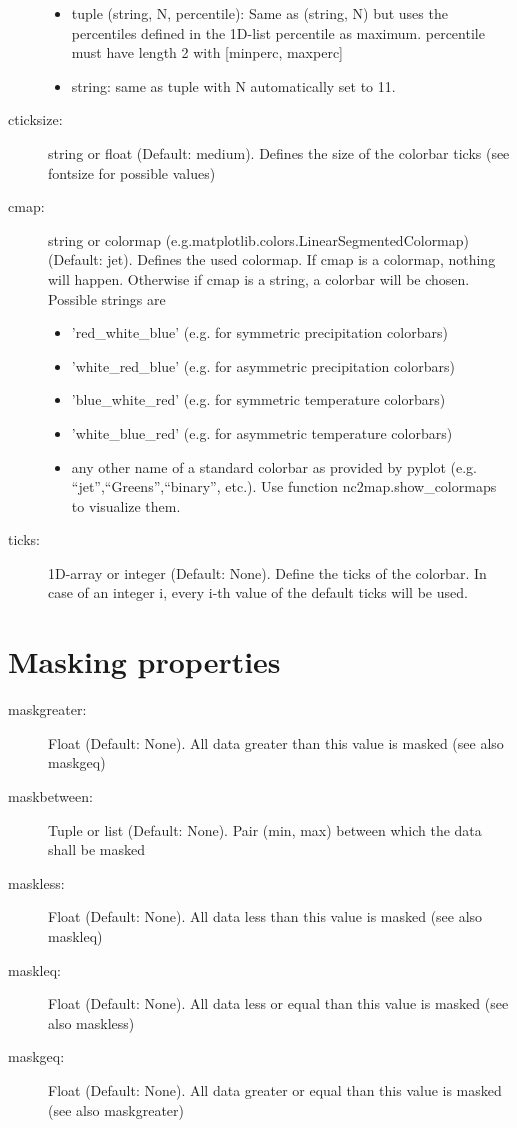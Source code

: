 \begin{description}
\begin{itemize}
    \item tuple (string, N, percentile): Same as (string, N) but uses the percentiles defined in the 1D-list percentile as maximum. percentile must have length 2 with [minperc, maxperc]
    \item string: same as tuple with N automatically set to 11.
\end{itemize}

    \item[\gls*{cticksize}:] \label{item:cticksize}  string or float (Default: medium). Defines the size of the colorbar ticks (see fontsize for possible values)
    \item[\gls*{cmap}:] \label{item:cmap}  string or colormap (e.g.matplotlib.colors.LinearSegmentedColormap) (Default: jet). Defines the used colormap. If cmap is a colormap, nothing will happen. Otherwise if cmap is a string, a colorbar will be chosen. Possible strings are
\begin{itemize}
    \item 'red\_white\_blue' (e.g. for symmetric precipitation colorbars)
    \item 'white\_red\_blue' (e.g. for asymmetric precipitation colorbars)
    \item 'blue\_white\_red' (e.g. for symmetric temperature colorbars)
    \item 'white\_blue\_red' (e.g. for asymmetric temperature colorbars)
    \item any other name of a standard colorbar as provided by pyplot (e.g. \enquote{jet},\enquote{Greens},\enquote{binary}, etc.). Use function nc2map.show\_colormaps to visualize them.
\end{itemize}

    \item[\gls*{ticks}:] \label{item:ticks}  1D-array or integer (Default: None). Define the ticks of the colorbar. In case of an integer i, every i-th value of the default ticks will be used.
\end{description}

\section{Masking properties}
\begin{description}
    \item[\gls*{maskgreater}:] \label{item:maskgreater}  Float (Default: None). All data greater than this value is masked (see also maskgeq)
    \item[\gls*{maskbetween}:] \label{item:maskbetween}  Tuple or list (Default: None). Pair (min, max) between which the data shall be masked
    \item[\gls*{maskless}:] \label{item:maskless}  Float (Default: None). All data less than this value is masked (see also maskleq)
    \item[\gls*{maskleq}:] \label{item:maskleq}  Float (Default: None). All data less or equal than this value is masked (see also maskless)
    \item[\gls*{maskgeq}:] \label{item:maskgeq}  Float (Default: None). All data greater or equal than this value is masked (see also maskgreater)
\end{description}

